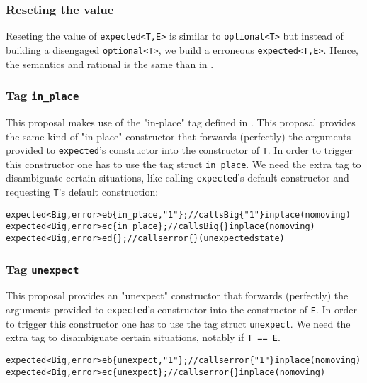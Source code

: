 \documentclass[a4paper,10pt]{article}
\newcommand{\cpp}[1]{\lstinline{#1}}
\begin{document}
\subsubsection{Reseting the value}

Reseting the value of \cpp{expected<T,E>} is similar to \cpp{optional<T>} but instead of building a disengaged \cpp{optional<T>}, we build a erroneous \cpp{expected<T,E>}. Hence, the semantics and rational is the same than in \cite{OptionalRev4}.

\subsubsection{Tag \cpp{in_place}}

This proposal makes use of the "in-place" tag defined in \cite{OptionalRev5}. This proposal  provides the same kind of "in-place" constructor that forwards (perfectly) the arguments provided to \cpp{expected}'s constructor into the constructor of \cpp{T}. In order to trigger this constructor one has to use the tag struct \cpp{in_place}. We need the extra tag to disambiguate certain situations, like calling \cpp{expected}'s default constructor and requesting \cpp{T}'s default construction:

\begin{alltt}
expected<Big, error> eb\{in_place, "1"\}; // calls Big\{"1"\} in place (no moving)
expected<Big, error> ec\{in_place\};      // calls Big\{\} in place (no moving)
expected<Big, error> ed\{\};              // calls error\{\} (unexpected state)
\end{alltt}


\subsubsection{Tag \cpp{unexpect}}

This proposal provides an "unexpect" constructor that forwards (perfectly) the arguments provided to \cpp{expected}'s constructor into the constructor of \cpp{E}. In order to trigger this constructor one has to use the tag struct \cpp{unexpect}. We need the extra tag to disambiguate certain situations, notably if \cpp{T == E}.

\begin{alltt}
expected<Big, error> eb\{unexpect, "1"\}; // calls error\{"1"\} in place (no moving)
expected<Big, error> ec\{unexpect\};      // calls error\{\} in place (no moving)
\end{alltt}
\end{document}
